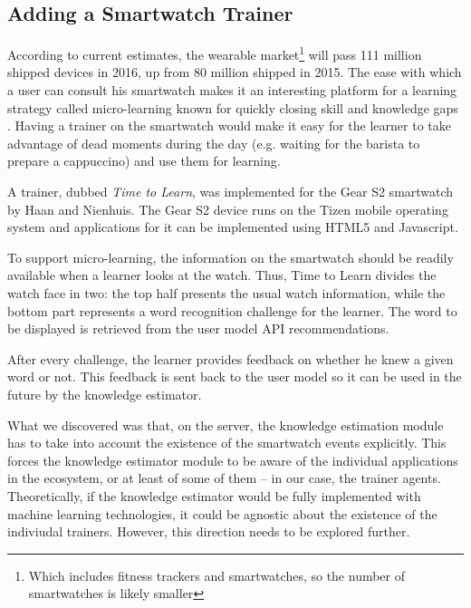 

\subsection {Adding a Smartwatch Trainer}

According to current estimates, the wearable market\footnote{Which includes fitness trackers and smartwatches, so the number of smartwatches is likely smaller} will pass 111 million shipped devices in 2016, up from 80 million shipped in 2015. The ease with which a user can consult his smartwatch makes it an interesting platform for a learning strategy called micro-learning known for quickly closing skill and knowledge gaps  \cite{Dear12}. Having a trainer on the smartwatch would make it easy for the learner to take advantage of dead moments during the day (e.g. waiting for the barista to prepare a cappuccino) and use them for learning.

A trainer, dubbed {\em Time to Learn}, was implemented for the Gear S2 smartwatch by Haan and Nienhuis\cite{Nien16time}. The Gear S2 device runs on the Tizen mobile operating system and applications for it can be implemented using HTML5 and Javascript.

To support micro-learning, the information on the smartwatch should be readily available when a learner looks at the watch. Thus, Time to Learn divides the watch face in two: the top half presents the usual watch information, while the bottom part represents a word recognition challenge for the learner. The word to be displayed is retrieved from the user model API recommendations. 

After every challenge, the learner provides feedback on whether he knew a given word or not. This feedback is sent back to the user model so it can be used in the future by the knowledge estimator. 

What we discovered was that, on the server, the knowledge estimation module has to take into account the existence of the smartwatch events explicitly. This forces the knowledge estimator module to be aware of the individual applications in the ecosystem, or at least of some of them -- in our case, the trainer agents. Theoretically, if the knowledge estimator would be fully implemented with machine learning technologies, it could be agnostic about the existence of the indiviudal trainers. However, this direction needs to be explored further.



